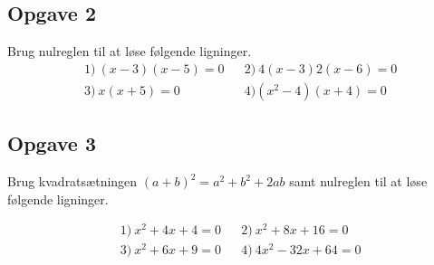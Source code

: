 \subsection*{Opgave 2}
Brug nulreglen til at løse følgende ligninger.
\begin{align*}
	&1) \ (x-3)(x-5) = 0  &&2) \ 4(x-3)2(x-6) = 0   \\
	&3) \ x(x+5) = 0  &&4) (x^2-4)(x+4) = 0  
\end{align*}

\subsection*{Opgave 3}
Brug kvadratsætningen $(a+b)^2 = a^2+b^2+2ab$ samt nulreglen til at løse følgende ligninger.


\begin{align*}
&1) \ x^2+4x+4 = 0   &&2) \ x^2+8x+16 = 0  \\
&3) \ x^2+6x + 9= 0  &&4) \ 4x^2-32x+64=0     
\end{align*}
